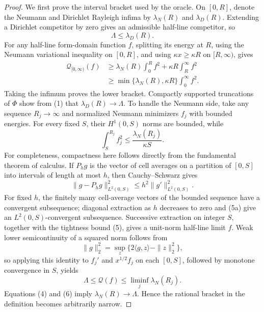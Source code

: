 \documentclass{article}
\begin{document}
{\begin{proof}
We first prove the interval bracket used by the oracle.  On \([0,R]\), denote the Neumann and Dirichlet Rayleigh infima by \(\lambda_N(R)\) and \(\lambda_D(R)\).  Extending a Dirichlet competitor by zero gives an admissible half-line competitor, so
\[
\Lambda\le\lambda_D(R). \tag{3}
\]
For any half-line form-domain function \(f\), splitting its energy at \(R\), using the Neumann variational inequality on \([0,R]\), and using \(\kappa x\ge\kappa R\) on \([R,\infty)\), gives
\[
\begin{aligned}
\mathcal Q_{[0,\infty)}(f)
&\ge \lambda_N(R)\int_0^R f^2+
\kappa R\int_R^\infty f^2\\
&\ge\min\{\lambda_N(R),\kappa R\}
\int_0^\infty f^2.
\end{aligned} \tag{4}
\]
Taking the infimum proves the lower bracket.  Compactly supported truncations of \(\Phi\) show from (1) that \(\lambda_D(R)\to\Lambda\).  To handle the Neumann side, take any sequence \(R_j\to\infty\) and normalized Neumann minimizers \(f_j\) with bounded energies.  For every fixed \(S\), their \(H^1(0,S)\) norms are bounded, while
\[
\int_S^{R_j}f_j^2\le\frac{\lambda_N(R_j)}{\kappa S}. \tag{5}
\]
For completeness, compactness here follows directly from the fundamental theorem of calculus.  If \(P_hg\) is the vector of cell averages on a partition of \([0,S]\) into intervals of length at most \(h\), then Cauchy--Schwarz gives
\[
\|g-P_hg\|_{L^2(0,S)}^2
\le h^2\|g'\|_{L^2(0,S)}^2. \tag{5a}
\]
For fixed \(h\), the finitely many cell-average vectors of the bounded sequence have a convergent subsequence; diagonal extraction as \(h\) decreases to zero and (5a) give an \(L^2(0,S)\)-convergent subsequence.  Successive extraction on integer \(S\), together with the tightness bound (5), gives a unit-norm half-line limit \(f\).  Weak lower semicontinuity of a squared norm follows from
\[
\|g\|_2^2=\sup_z\{2\langle g,z\rangle-\|z\|_2^2\},
\]
so applying this identity to \(f_j'\) and \(x^{1/2}f_j\) on each \([0,S]\), followed by monotone convergence in \(S\), yields
\[
\Lambda\le\mathcal Q(f)\le\liminf_j\lambda_N(R_j). \tag{6}
\]
Equations (4) and (6) imply \(\lambda_N(R)\to\Lambda\).  Hence the rational bracket in the definition becomes arbitrarily narrow.


\end{proof}}
\end{document}

